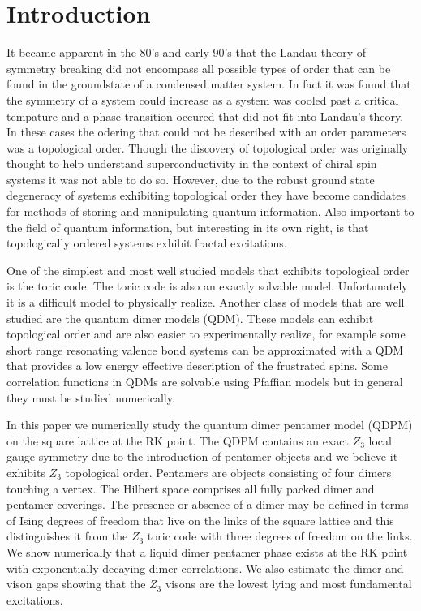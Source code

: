 \documentclass[aps,floatfix,11pt,twocolumn]{revtex4-1}
\begin{document}
\section{Introduction}

    It became apparent in the 80's and early 90's that the Landau theory of symmetry breaking did not
    encompass all possible types of order that can be found in the groundstate of a condensed matter system. 
    In fact it was found that the symmetry of a system
    could increase as a system was cooled past a critical tempature and a phase transition occured
    that did not fit into Landau's theory. In these cases the odering 
    that could not be described with an order
    parameters \cite{wen_1990} was a topological order. Though the discovery of topological order was originally thought
    to help understand superconductivity in the context of chiral spin systems \cite{HERE} it was
    not able to do so. However, due to the robust ground state degeneracy of systems exhibiting
    topological order they have become candidates for methods of storing and manipulating
    quantum information.  Also important to the field of quantum information, but interesting in
    its own right, is that topologically ordered systems exhibit fractal excitations. 

    One of the simplest and most well studied models that exhibits topological order is the
    toric code. The toric code is also an exactly solvable model. Unfortunately it is
    a difficult model to physically realize. Another class of models that are well studied are
    the quantum dimer models (QDM).  These models can exhibit topological order and are also
    easier to experimentally realize, for example some short range resonating valence bond
    systems can be approximated with a QDM that provides a low energy effective description of
    the frustrated spins. Some correlation functions in QDMs are solvable using Pfaffian models
    but in general they must be studied numerically. 

    In this paper we numerically study the quantum dimer pentamer model (QDPM) on the square
    lattice at the RK point.  The QDPM contains an exact $Z_3$ local gauge symmetry due to the
    introduction of pentamer objects and we believe it exhibits $Z_3$ topological order.
    Pentamers are objects consisting of four dimers touching a vertex.  The Hilbert space
    comprises all fully packed dimer and pentamer coverings. The presence or absence of a dimer
    may be defined in terms of Ising degrees of freedom that live on the links of the square
    lattice and this distinguishes it from the $Z_3$ toric code with three degrees of freedom on
    the links. We show numerically that a liquid dimer pentamer phase exists at the RK point
    with exponentially decaying dimer correlations. We also estimate the dimer and vison gaps
    showing that the $Z_3$ visons are the lowest lying and most fundamental excitations.
\end{document}
